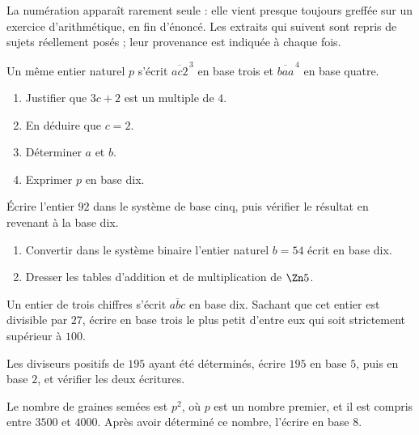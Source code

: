 \begin{annales}
La numération apparaît rarement seule : elle vient presque toujours greffée
sur un exercice d'arithmétique, en fin d'énoncé. Les extraits qui suivent sont
repris de sujets réellement posés ; leur provenance est indiquée à chaque
fois.

Un même entier naturel $p$ s'écrit $\overline{ac2}^{\,3}$ en base trois et
$\overline{baa}^{\,4}$ en base quatre.
\begin{enumerate}[label=\textbf{\alph*)}, leftmargin=*, itemsep=0.15em]
  \item Justifier que $3c+2$ est un multiple de $4$.
  \item En déduire que $c = 2$.
  \item Déterminer $a$ et $b$.
  \item Exprimer $p$ en base dix.
\end{enumerate}

Écrire l'entier $92$ dans le système de base cinq, puis vérifier le résultat
en revenant à la base dix.

\begin{enumerate}[label=\textbf{\alph*)}, leftmargin=*, itemsep=0.15em]
  \item Convertir dans le système binaire l'entier naturel $b = 54$ écrit en
        base dix.
  \item Dresser les tables d'addition et de multiplication de $\Zn 5$.
\end{enumerate}

Un entier de trois chiffres s'écrit $\overline{abc}$ en base dix. Sachant que
cet entier est divisible par $27$, écrire en base trois le plus petit d'entre
eux qui soit strictement supérieur à $100$.

Les diviseurs positifs de $195$ ayant été déterminés, écrire $195$ en base
$5$, puis en base $2$, et vérifier les deux écritures.

Le nombre de graines semées est $p^{2}$, où $p$ est un nombre premier, et il
est compris entre $3500$ et $4000$. Après avoir déterminé ce nombre, l'écrire
en base $8$.
\end{annales}

